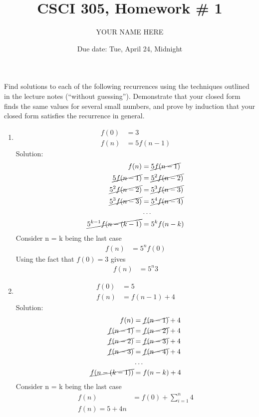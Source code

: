 \documentclass{article}
\title{CSCI 305, Homework \# 1}
\author{YOUR NAME HERE}
\date{Due date: Tue, April 24, Midnight}
\begin{document}
\maketitle

Find solutions to each of the following recurrences
using the techniques outlined in the lecture notes (``without guessing'').
Demonstrate that your closed form finds the same values for several
small numbers, and prove by induction that your closed form satisfies
the recurrence in general.

\begin{enumerate}
\item
  \begin{align*}
    f(0) &= 3\\
    f(n) &= 5f(n-1)
  \end{align*}
  Solution:
  \begin{align*}
    f(n) &= \cancel{5f(n-1)}\\
    \cancel{5f(n-1)} &= \cancel{5^2f(n-2)}\\
    \cancel{5^2f(n-2)} &= \cancel{5^3f(n-3)}\\
    \cancel{5^3f(n-3)} &= \cancel{5^4f(n-4)}\\
    &\ldots\\
    \cancel{5^{k-1}f(n-(k-1)} &= 5^{k}f(n-k)
  \end{align*}
    Consider n = k being the last case
  \begin{align*}
    f(n)
    &= 5^{n}f(0)
  \end{align*}
  Using the fact that $f(0)=3$ gives 
  \begin{align*}
    f(n)
    &= 5^{n}3
  \end{align*}



\item
  \begin{align*}
    f(0) &= 5\\
    f(n) &= f(n-1) + 4
  \end{align*}
  Solution:
  \begin{align*}
    f(n) &= \cancel{f(n-1)}+4\\ 
    \cancel{f(n-1)} &= \cancel{f(n-2)} +4\\ 
    \cancel{f(n-2)} &= \cancel{f(n-3)} +4\\
    \cancel{f(n-3)} &= \cancel{f(n-4)} +4\\
    &\ldots\\
    \cancel{f(n-(k-1))} &= f(n-k)+4
  \end{align*}
  Consider n = k being the last case
  \begin{align*}
    f(n) &= f(0)+ \sum_{i=1}^{n}4 \\
    f(n) = 5 + 4n \\
  \end{align*}


\end{enumerate}
\end{document}
